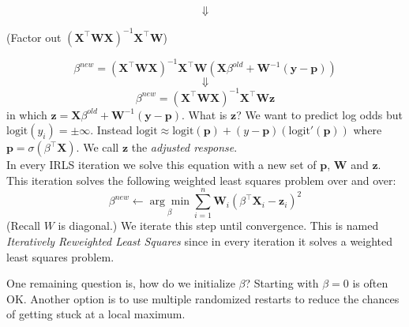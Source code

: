 \documentclass[a4paper]{article}
\begin{document}
$$\Downarrow$$
\begin{center}(Factor out $(\mathbf{X}^\top \mathbf{W}\mathbf{X})^{-1}\mathbf{X}^\top \mathbf{W}$)\end{center}
$$\beta^{new} = (\mathbf{X}^\top \mathbf{W}\mathbf{X})^{-1}\mathbf{X}^\top \mathbf{W}(\mathbf{X}\beta^{old}+\mathbf{W}^{-1}(\mathbf{y}-\mathbf{p}))$$
$$\Downarrow$$
$$\beta^{new} = (\mathbf{X}^\top \mathbf{W}\mathbf{X})^{-1}\mathbf{X}^\top \mathbf{W}\mathbf{z}$$
in which $\mathbf{z}=\mathbf{X}\beta^{old}+\mathbf{W}^{-1}(\mathbf{y}-\mathbf{p})$. What is $\mathbf{z}$? We want to predict log odds but $\text{logit}(y_i) = \pm\infty$. Instead $\text{logit} \approx \text{logit}(\mathbf{p}) + (y-\mathbf{p})(\text{logit}'(\mathbf{p}))$ where $\mathbf{p} = \sigma(\beta^\top \mathbf{X})$.  We call $\mathbf{z}$ the \textit{adjusted response}.\\
In every IRLS iteration we solve this equation with a new set of $\mathbf{p}$, $\mathbf{W}$ and $\mathbf{z}$. This iteration solves the following weighted least squares problem over and over:
$$\beta^{new}\leftarrow\underset{\beta}{\arg\min}\sum_{i=1}^{n}\mathbf{W}_i(\beta^\top\mathbf{X}_i - \mathbf{z}_i)^2$$
(Recall $W$ is diagonal.)
We iterate this step until  convergence. 
This is named \emph{Iteratively Reweighted Least Squares} since in every iteration it solves a weighted least squares problem.

One remaining question is, how do we initialize $\beta$? Starting with $\beta=0$ is often OK.  Another option is to use multiple randomized restarts to reduce the chances of getting stuck at a local maximum.
\end{document}
